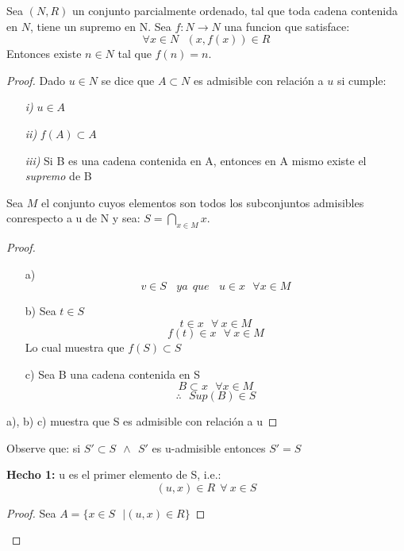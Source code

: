 \begin{prop12}
Sea $ (N,R) $ un conjunto parcialmente ordenado, tal que toda cadena contenida en $ N $, tiene un supremo en N. 
Sea $ f:N\rightarrow N $ una funcion que satisface:
\[ \forall x \in N   \ \ \  (x,f(x)) \in R \]
Entonces existe $ n \in N $ tal que $ f(n) = n $.


\end{prop12}




\begin{proof}
Dado $ u \in  N  $ se dice que $ A \subset N$ es admisible con relación a $ u $ si cumple:
\begin{itemize}
\item[\textit{i)}] $ u \in A$
\item[\textit{ii)}]$ f(A)\subset A $
\item[\textit{iii)}] Si B es una cadena contenida en A, entonces en A  mismo existe el \textit{supremo} de B
\end{itemize}

Sea $ M $ el conjunto cuyos elementos son todos los subconjuntos  admisibles conrespecto a u de N y sea:
$S= \bigcap\limits_{x\in M} x$.
\begin{proof}

\begin{itemize}

\item[a)]
 $$ v \in S  \ \ \ \  ya \ \ que  \ \ \ \  u \in x \  \ \ \forall x \in M $$
 
\item[b)]
Sea $ t \in S$
$$ t \in x \ \ \  \forall \ x\in M$$
$$f(t) \in x \ \ \ \forall \ x\in M $$
Lo cual muestra que $ f(S) \subset S $

\item[c)] Sea B una cadena contenida en S
$$ B \subset x \ \ \ \forall x \in M $$
$$ \therefore \ \ \ Sup(B) \in S$$ 

\end{itemize}
a), b) c) muestra que S es admisible con relación a u
\end{proof}
Observe que: si  $ S' \subset S      \ \ \wedge \ \ S' $ es u-admisible entonces $ S' = S $ 


\bigskip
\bigskip

\textbf{Hecho 1:} u  es el primer elemento de S,
 i.e.:$$ (u,x) \in R \ \ \forall \ x \in S $$
 
\begin{proof}
Sea $ A = \lbrace x \in S \ \ \ \vert (u,x) \in R \rbrace $


\end{proof}
\end{proof}
